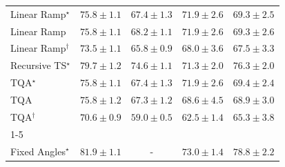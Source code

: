 \begin{tabular}{l|cccc|}
Linear Ramp$^\star$ & {\cellcolor[HTML]{D15205}} \color[HTML]{F1F1F1} $75.8\pm 1.1$ & {\cellcolor[HTML]{FEC754}} \color[HTML]{000000} $67.4\pm 1.3$ & {\cellcolor[HTML]{F5851F}} \color[HTML]{F1F1F1} $71.9\pm 2.6$ & {\cellcolor[HTML]{FEAB39}} \color[HTML]{000000} $69.3\pm 2.5$ \\
Linear Ramp & {\cellcolor[HTML]{D15205}} \color[HTML]{F1F1F1} $75.8\pm 1.1$ & {\cellcolor[HTML]{FEBB47}} \color[HTML]{000000} $68.2\pm 1.1$ & {\cellcolor[HTML]{F5851F}} \color[HTML]{F1F1F1} $71.9\pm 2.6$ & {\cellcolor[HTML]{FEAB39}} \color[HTML]{000000} $69.3\pm 2.6$ \\
Linear Ramp$^\dagger$ & {\cellcolor[HTML]{EA6E13}} \color[HTML]{F1F1F1} $73.5\pm 1.1$ & {\cellcolor[HTML]{FED87A}} \color[HTML]{000000} $65.8\pm 0.9$ & {\cellcolor[HTML]{FEBE4A}} \color[HTML]{000000} $68.0\pm 3.6$ & {\cellcolor[HTML]{FEC652}} \color[HTML]{000000} $67.5\pm 3.3$ \\
Recursive TS$^\star$ & {\cellcolor[HTML]{8E3104}} \color[HTML]{F1F1F1} $79.7\pm 1.2$ & {\cellcolor[HTML]{DE610C}} \color[HTML]{F1F1F1} $74.6\pm 1.1$ & {\cellcolor[HTML]{F98E23}} \color[HTML]{F1F1F1} $71.3\pm 2.0$ & {\cellcolor[HTML]{CB4B02}} \color[HTML]{F1F1F1} $76.3\pm 2.0$ \\
TQA$^\star$ & {\cellcolor[HTML]{D15205}} \color[HTML]{F1F1F1} $75.8\pm 1.1$ & {\cellcolor[HTML]{FEC754}} \color[HTML]{000000} $67.4\pm 1.3$ & {\cellcolor[HTML]{F5851F}} \color[HTML]{F1F1F1} $71.9\pm 2.6$ & {\cellcolor[HTML]{FEAA38}} \color[HTML]{000000} $69.4\pm 2.4$ \\
TQA & {\cellcolor[HTML]{D15205}} \color[HTML]{F1F1F1} $75.8\pm 1.2$ & {\cellcolor[HTML]{FEC857}} \color[HTML]{000000} $67.3\pm 1.2$ & {\cellcolor[HTML]{FEB643}} \color[HTML]{000000} $68.6\pm 4.5$ & {\cellcolor[HTML]{FEB13E}} \color[HTML]{000000} $68.9\pm 3.0$ \\
TQA$^\dagger$ & {\cellcolor[HTML]{FD9728}} \color[HTML]{000000} $70.6\pm 0.9$ & {\cellcolor[HTML]{FFFFE5}} \color[HTML]{000000} $59.0\pm 0.5$ & {\cellcolor[HTML]{FFF3B4}} \color[HTML]{000000} $62.5\pm 1.4$ & {\cellcolor[HTML]{FEDD84}} \color[HTML]{000000} $65.3\pm 3.8$ \\
\cline{1-5}
\multicolumn{5}{c}{\rule{0pt}{8pt}PP} \\
\midrule
Fixed Angles$^\star$ & {\cellcolor[HTML]{004629}} \color[HTML]{F1F1F1} $81.9\pm 1.1$ & {\cellcolor[HTML]{000000}} \color[HTML]{F1F1F1} {\cellcolor{white}} \color{black} - & {\cellcolor[HTML]{49AF61}} \color[HTML]{F1F1F1} $73.0\pm 1.4$ & {\cellcolor[HTML]{036B38}} \color[HTML]{F1F1F1} $78.8\pm 2.2$ \\

\end{tabular}
